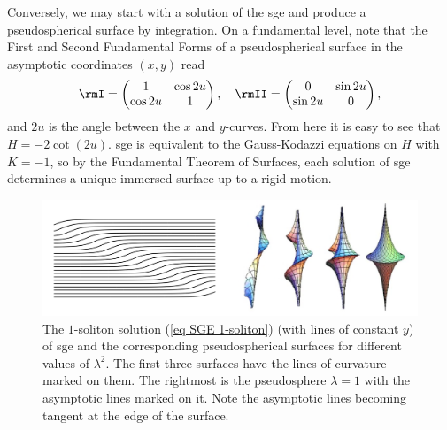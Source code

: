 Conversely, we may start with a solution of the \gls{sge} and produce a pseudospherical surface by integration. On a fundamental level, note that the First and Second Fundamental Forms of a pseudospherical surface in the asymptotic coordinates $(x,y)$ read 
\[
    \rmI=\begin{pmatrix}
        1 &\cos 2u\\
        \cos 2u & 1
    \end{pmatrix},\quad
    \rmII=\begin{pmatrix}
        0 & \sin 2u\\
        \sin 2u & 0
    \end{pmatrix},
\]
and $2u$ is the angle between the $x$ and $y$-curves. From here it is easy to see that $H=-2\cot(2u)$. \gls{sge} is equivalent to the Gauss-Kodazzi equations on $H$ with $K=-1$, so by the Fundamental Theorem of Surfaces, each solution of \gls{sge} determines a unique immersed surface up to a rigid motion. 

\begin{figure}[tp]
    \centering
    \includegraphics[scale=0.2]{figures/SG1soliton.png}
    \caption{The $1$-soliton solution (\ref{eq SGE 1-soliton}) (with lines of constant $y$) of \gls{sge} and the corresponding pseudospherical surfaces for different values of $\lambda^2$. The first three surfaces have the lines of curvature marked on them. The rightmost is the pseudosphere $\lambda=1$ with the asymptotic lines marked on it. Note the asymptotic lines becoming tangent at the edge of the surface.}
    \label{fig: SGE 1-soliton}
\end{figure}

